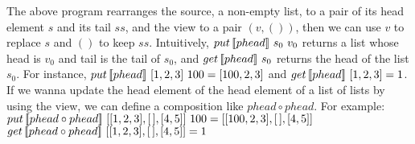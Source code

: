 The above program rearranges the source, a non-empty list, to a pair of its head element $s$ and its tail $ss$, and the view to a pair $(v, ())$, then we can use $v$ to replace $s$ and $()$ to keep $ss$. Intuitively, $put \, [\![phead]\!] \ s_0 \ v_0$ returns a list whose head is $v_0$ and tail is the tail of $s_0$, and $get \, [\![phead]\!] \ s_0$ returns the head of the list $s_0$. For instance, $put \, [\![phead]\!] \ [1,2,3] \ 100 = [100,2,3]$ and $get \, [\![phead]\!] \ [1,2,3] = 1$. If we wanna update the head element of the head element of a list of lists by using the view, we can define a composition like $phead \circ phead$. For example:\\
\tab $put \, [\![phead \circ phead]\!] \ [[1,2,3],[\,],[4,5]] \ 100 = [[100,2,3],[\,],[4,5]]$\\
\tab $get \, [\![phead \circ phead]\!] \ [[1,2,3],[\,],[4,5]] = 1$